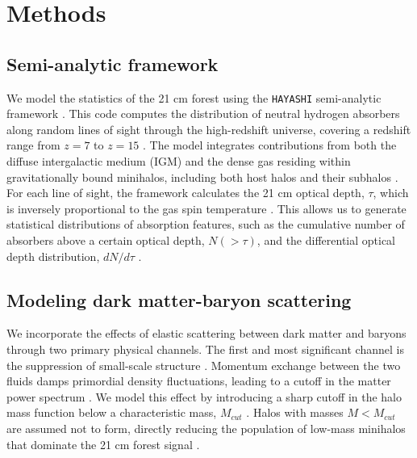 \documentclass[]{article}
\begin{document}
\section{Methods}
\label{sec:methods}
\subsection{Semi-analytic framework}

We model the statistics of the 21 cm forest using the \texttt{HAYASHI} semi-analytic framework \citep{Furlanetto_2002,Shao_2025,Xu_2009}. This code computes the distribution of neutral hydrogen absorbers along random lines of sight through the high-redshift universe, covering a redshift range from $z=7$ to $z=15$ \citep{Xu_2009,Furlanetto_2002,_oltinsk__2021,Shao_2025}. The model integrates contributions from both the diffuse intergalactic medium (IGM) and the dense gas residing within gravitationally bound minihalos, including both host halos and their subhalos \citep{Furlanetto_2002,_oltinsk__2021,Xu__2018}. For each line of sight, the framework calculates the 21 cm optical depth, $\tau$, which is inversely proportional to the gas spin temperature \citep{Xu_2009,šoltinský2025prospectsstatisticaldetection21cm}. This allows us to generate statistical distributions of absorption features, such as the cumulative number of absorbers above a certain optical depth, $N(>\tau)$, and the differential optical depth distribution, $dN/d\tau$ \citep{Furlanetto_2002,Shao_2025,šoltinský2025prospectsstatisticaldetection21cm}.

\subsection{Modeling dark matter-baryon scattering}

We incorporate the effects of elastic scattering between dark matter and baryons through two primary physical channels. The first and most significant channel is the suppression of small-scale structure \citep{Liu_2019,Dvorkin_2014,Slatyer_2018,tashiro2014effectsdarkmatterbaryonscattering,Rahimieh_2026,Halder_2021}. Momentum exchange between the two fluids damps primordial density fluctuations, leading to a cutoff in the matter power spectrum \citep{Dvorkin_2014,Liu_2019}. We model this effect by introducing a sharp cutoff in the halo mass function below a characteristic mass, $M_{cut}$ \citep{Liu_2019}. Halos with masses $M < M_{cut}$ are assumed not to form, directly reducing the population of low-mass minihalos that dominate the 21 cm forest signal \citep{Liu_2019,tashiro2014effectsdarkmatterbaryonscattering,Slatyer_2018,Halder_2021,Rahimieh_2026}.
\end{document}
